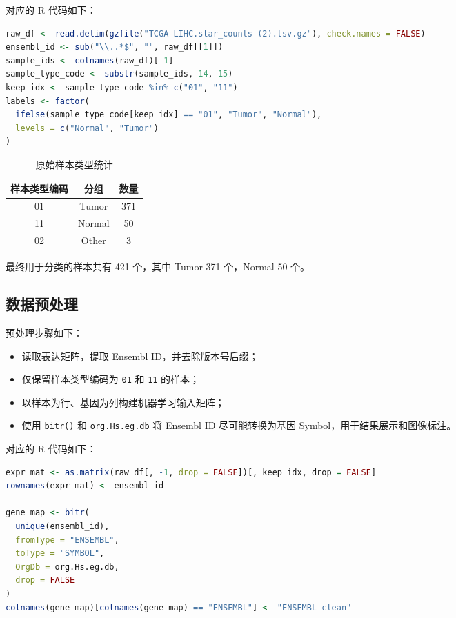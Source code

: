 \documentclass[12pt,fontset=fandol]{ctexart}
\begin{document}
对应的 R 代码如下：
\begin{lstlisting}[language=R]
raw_df <- read.delim(gzfile("TCGA-LIHC.star_counts (2).tsv.gz"), check.names = FALSE)
ensembl_id <- sub("\\..*$", "", raw_df[[1]])
sample_ids <- colnames(raw_df)[-1]
sample_type_code <- substr(sample_ids, 14, 15)
keep_idx <- sample_type_code %in% c("01", "11")
labels <- factor(
  ifelse(sample_type_code[keep_idx] == "01", "Tumor", "Normal"),
  levels = c("Normal", "Tumor")
)
\end{lstlisting}

\begin{table}[H]
\centering
\caption{原始样本类型统计}
\begin{tabular}{ccc}
\toprule
样本类型编码 & 分组 & 数量 \\
\midrule
01 & Tumor & 371 \\
11 & Normal & 50 \\
02 & Other & 3 \\
\bottomrule
\end{tabular}
\end{table}

最终用于分类的样本共有 421 个，其中 Tumor 371 个，Normal 50 个。

\subsection{数据预处理}
预处理步骤如下：
\begin{itemize}
  \item 读取表达矩阵，提取 Ensembl ID，并去除版本号后缀；
  \item 仅保留样本类型编码为 \texttt{01} 和 \texttt{11} 的样本；
  \item 以样本为行、基因为列构建机器学习输入矩阵；
  \item 使用 \texttt{bitr()} 和 \texttt{org.Hs.eg.db} 将 Ensembl ID 尽可能转换为基因 Symbol，用于结果展示和图像标注。
\end{itemize}

对应的 R 代码如下：
\begin{lstlisting}[language=R]
expr_mat <- as.matrix(raw_df[, -1, drop = FALSE])[, keep_idx, drop = FALSE]
rownames(expr_mat) <- ensembl_id

gene_map <- bitr(
  unique(ensembl_id),
  fromType = "ENSEMBL",
  toType = "SYMBOL",
  OrgDb = org.Hs.eg.db,
  drop = FALSE
)
colnames(gene_map)[colnames(gene_map) == "ENSEMBL"] <- "ENSEMBL_clean"
\end{lstlisting}
\end{document}
